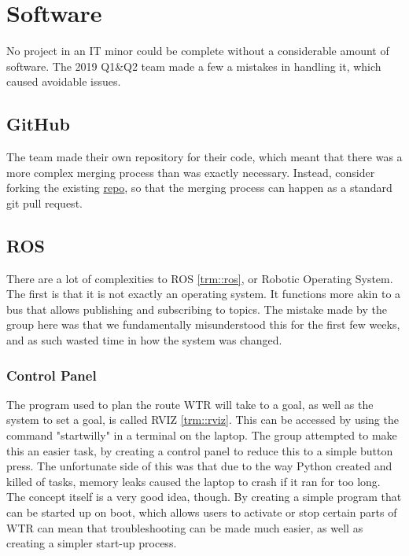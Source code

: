 \section{Software}
No project in an IT minor could be complete without a considerable amount of software.
The 2019 Q1\&Q2 team made a few a mistakes in handling it, which caused avoidable issues.

\subsection{GitHub}
The team made their own repository for their code, which meant that there was a more complex merging process than was exactly necessary.
Instead, consider forking the existing \href{https://github.com/Windesheim-Willy/}{repo}, so that the merging process can happen as a standard git pull request.

\subsection{ROS}
There are a lot of complexities to ROS \ref{trm::ros}, or Robotic Operating System.
The first is that it is not exactly an operating system.
It functions more akin to a bus that allows publishing and subscribing to topics.
The mistake made by the group here was that we fundamentally misunderstood this for the first few weeks, and as such wasted time in how the system was changed.

\subsubsection{Control Panel}
The program used to plan the route WTR will take to a goal, as well as the system to set a goal, is called RVIZ \ref{trm::rviz}.
This can be accessed by using the command "startwilly" in a terminal on the laptop.
The group attempted to make this an easier task, by creating a control panel to reduce this to a simple button press.
The unfortunate side of this was that due to the way Python created and killed of tasks, memory leaks caused the laptop to crash if it ran for too long.
The concept itself is a very good idea, though.
By creating a simple program that can be started up on boot, which allows users to activate or stop certain parts of WTR can mean that troubleshooting can be made much easier, as well as creating a simpler start-up process.

